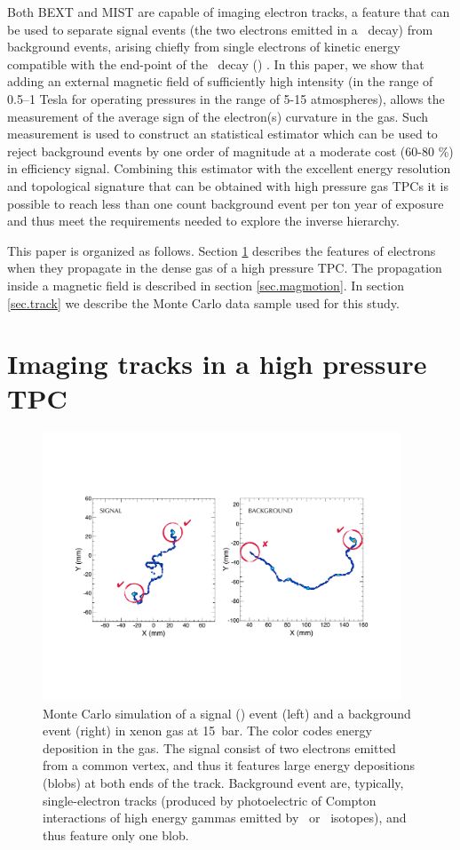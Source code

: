 \documentclass{JINST}
\begin{document}
 Both BEXT and MIST are capable of imaging electron tracks, a feature that can be used to separate signal events (the two electrons emitted in a \bbonu\ decay) from background events, arising chiefly from single electrons of kinetic energy compatible with the end-point of the \bbonu\ decay (\Qbb) . In this paper, we show that 
adding an external magnetic field of sufficiently high intensity (in the range of 0.5--1 Tesla for operating pressures in the range of 5-15 atmospheres), allows the measurement of the average sign of the electron(s) curvature in the gas. Such measurement is used  to construct an statistical estimator which can be used to reject background events by one order of magnitude at a moderate cost (60-80 \%) in efficiency signal. Combining this estimator with the excellent energy resolution and topological signature that can be obtained with high pressure gas TPCs it is possible to reach less than one count background event per ton year of exposure and thus meet the requirements needed to explore the inverse hierarchy.


This paper is organized as follows. Section \ref{sec.topology} describes the features of electrons when they propagate in the dense gas of a high pressure TPC.  The propagation inside a magnetic field is described in section \ref{sec.magmotion}. In section \ref{sec.track} we describe the Monte Carlo data sample used for this study. 

\section{Imaging tracks in a high pressure TPC}
\label{sec.topology}
\begin{figure}[!htb]
\centering
\includegraphics[width= 0.95\textwidth]{img/TrackSignature.pdf}
\caption{Monte Carlo simulation of a signal (\bbonu) event (left) and a  background event (right) in xenon gas at 15~bar. The color codes energy deposition in the gas. The signal consist of two electrons emitted from a common vertex, and thus it features large energy depositions  (blobs) at both ends of the track. Background event are, typically, single-electron tracks (produced by photoelectric of Compton interactions of high energy gammas emitted by \BI\ or \TL\ isotopes), and thus feature only one blob.} \label{fig.ETRK2}
\end{figure}
\end{document}
